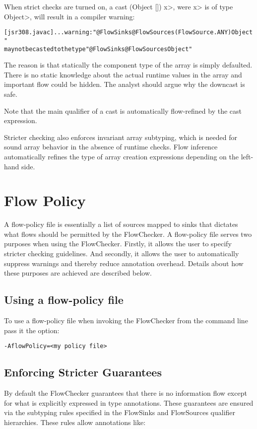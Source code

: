 When strict checks are turned on,
a cast \<(Object []) x>, were \<x> is of type \<Object>, will result
in a compiler warning:

\begin{alltt}
[jsr308.javac] ... warning: "@FlowSinks @FlowSources({FlowSource.ANY}) Object"
       may not be casted to the type "@FlowSinks @FlowSources Object"
\end{alltt}

The reason is that statically the component type of the array is
simply defaulted. There is no static knowledge about the actual
runtime values in the array and important flow could be hidden.
The analyst should argue why the downcast is safe.

Note that the main qualifier of a cast is automatically flow-refined
by the cast expression.


\medskip

Stricter checking also enforces invariant array subtyping, which is
needed for sound array behavior in the absence of runtime checks.
Flow inference automatically refines the type of array creation
expressions depending on the left-hand side.

\section{Flow Policy}
\label{sec:flowpolicy}

A flow-policy file is essentially a list of sources mapped to sinks
that dictates what flows should be permitted by the FlowChecker.  A
flow-policy file serves two purposes when using the FlowChecker.
Firstly, it allows the user to specify stricter checking guidelines.
And secondly, it allows the user to automatically suppress warnings
and thereby reduce annotation overhead.  Details about how these
purposes are achieved are described below.

\subsection{Using a flow-policy file}
To use a flow-policy file when invoking the FlowChecker from the
command line pass it the option:
\begin{Verbatim}
-AflowPolicy=<my policy file>
\end{Verbatim}

\subsection{Enforcing Stricter Guarantees}
By default the FlowChecker guarantees that there is no information
flow except for what is explicitly expressed in type annotations.
These guarantees are ensured via the subtyping rules specified
in the FlowSinks and FlowSources qualifier hierarchies.
These rules allow annotations like:

